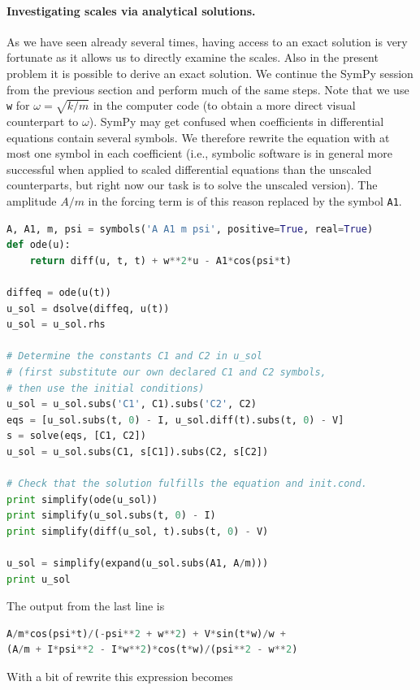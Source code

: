 \documentclass[graybox,envcountchap,sectrefs,final]{svmonodo}
\begin{document}
\paragraph{Investigating scales via analytical solutions.}
As we have seen already several times, having access to
an exact solution is very fortunate as it allows us to directly
examine the scales. Also in the present problem it is possible
to derive an exact solution. We
continue the SymPy session from the previous section and perform much
of the same steps. Note that we use \texttt{w} for $\omega = \sqrt{k/m}$
in the computer code (to obtain a more direct visual counterpart to
$\omega$).
SymPy may get confused when coefficients in differential equations
contain several symbols. We therefore rewrite the equation with
at most one symbol in each coefficient (i.e., symbolic software is
in general
more successful when applied to scaled differential equations than the
unscaled counterparts, but right now our task is to solve the unscaled version).
The amplitude $A/m$ in the forcing term is of this reason
replaced by the symbol \texttt{A1}.

\begin{lstlisting}[language=Python,style=graycolor]
A, A1, m, psi = symbols('A A1 m psi', positive=True, real=True)
def ode(u):
    return diff(u, t, t) + w**2*u - A1*cos(psi*t)

diffeq = ode(u(t))
u_sol = dsolve(diffeq, u(t))
u_sol = u_sol.rhs

# Determine the constants C1 and C2 in u_sol
# (first substitute our own declared C1 and C2 symbols,
# then use the initial conditions)
u_sol = u_sol.subs('C1', C1).subs('C2', C2)
eqs = [u_sol.subs(t, 0) - I, u_sol.diff(t).subs(t, 0) - V]
s = solve(eqs, [C1, C2])
u_sol = u_sol.subs(C1, s[C1]).subs(C2, s[C2])

# Check that the solution fulfills the equation and init.cond.
print simplify(ode(u_sol))
print simplify(u_sol.subs(t, 0) - I)
print simplify(diff(u_sol, t).subs(t, 0) - V)

u_sol = simplify(expand(u_sol.subs(A1, A/m)))
print u_sol
\end{lstlisting}
The output from the last line is

\begin{lstlisting}[language=Python,style=graycolor]
A/m*cos(psi*t)/(-psi**2 + w**2) + V*sin(t*w)/w +
(A/m + I*psi**2 - I*w**2)*cos(t*w)/(psi**2 - w**2)
\end{lstlisting}
With a bit of rewrite this expression becomes
\end{document}
